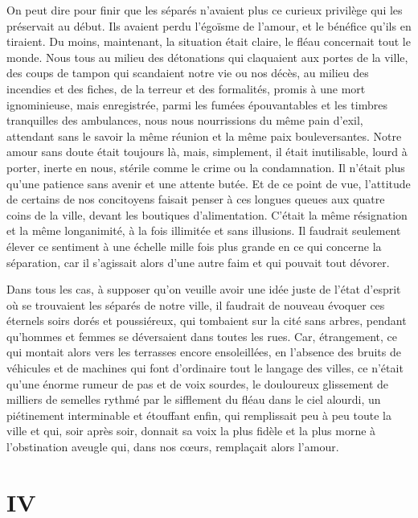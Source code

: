 \documentclass[french,twoside]{book} %
\newcommand\chapteropen{} %
\newcommand\chapterclose{} %
\begin{document}
On peut dire pour finir que les séparés n’avaient plus ce curieux privilège qui les préservait au début. Ils avaient perdu l’égoïsme de l’amour, et le bénéfice qu’ils en tiraient. Du moins, maintenant, la situation était claire, le fléau concernait tout le monde. Nous tous au milieu des détonations qui claquaient aux portes de la ville, des coups de tampon qui scandaient notre vie ou nos décès, au milieu des incendies et des fiches, de la terreur et des formalités, promis à une mort ignominieuse, mais enregistrée, parmi les fumées épouvantables et les timbres tranquilles des ambulances, nous nous nourrissions du même pain d’exil, attendant sans le savoir la même réunion et la même paix bouleversantes. Notre amour sans doute était toujours là, mais, simplement, il était inutilisable, lourd à porter, inerte en nous, stérile comme le crime ou la condamnation. Il n’était plus qu’une patience sans avenir et une attente butée. Et de ce point de vue, l’attitude de certains de nos concitoyens faisait penser à ces longues queues aux quatre coins de la ville, devant les boutiques d’alimentation. C’était la même résignation et la même longanimité, à la fois illimitée et sans illusions. Il faudrait seulement élever ce sentiment à une échelle mille fois plus grande en ce qui concerne la séparation, car il s’agissait alors d’une autre faim et qui pouvait tout dévorer.\par
Dans tous les cas, à supposer qu’on veuille avoir une idée juste de l’état d’esprit où se trouvaient les séparés de notre ville, il faudrait de nouveau évoquer ces éternels soirs dorés et poussiéreux, qui tombaient sur la cité sans arbres, pendant qu’hommes et femmes se déversaient dans toutes les rues. Car, étrangement, ce qui montait alors vers les terrasses encore ensoleillées, en l’absence des bruits de véhicules et de machines qui font d’ordinaire tout le langage des villes, ce n’était qu’une énorme rumeur de pas et de voix sourdes, le douloureux glissement de milliers de semelles rythmé par le sifflement du fléau dans le ciel alourdi, un piétinement interminable et étouffant enfin, qui remplissait peu à peu toute la ville et qui, soir après soir, donnait sa voix la plus fidèle et la plus morne à l’obstination aveugle qui, dans nos cœurs, remplaçait alors l’amour.
\chapterclose


\chapteropen
\chapter[{IV}]{IV}\renewcommand{\leftmark}{IV}
\end{document}
